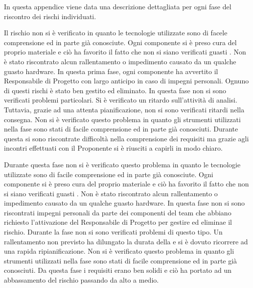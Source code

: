 	In questa appendice viene data una descrizione dettagliata per ogni fase del riscontro dei rischi individuati.


		Il rischio non si è verificato in quanto le tecnologie utilizzate sono di facele comprensione ed in parte già conosciute.
		Ogni componente si è preso cura del proprio materiale e ciò ha favorito il fatto che non si siano verificati guasti . Non è stato riscontrato alcun rallentamento o impedimento causato da un qualche guasto hardware.
		In questa prima fase, ogni componente ha avvertito il Responsabile di Progetto con largo anticipo in caso di impegni personali. Ognuno di questi rischi è stato ben gestito ed eliminato.
		In questa fase non si sono verificati problemi particolari.
		Si è verificato un ritardo sull’attività di analisi. Tuttavia, grazie ad una attenta pianificazione, non si sono verificati ritardi nella consegna.
		Non si è verificato questo problema in quanto gli strumenti utilizzati nella fase sono stati di facile comprensione ed in parte già conosciuti.
		Durante questa  si sono riscontrate difficoltà nella comprensione dei requisiti ma grazie agli incontri effettuati con il Proponente si è riusciti a capirli in modo chiaro.
		
	
		Durante questa fase non si è verificato questo problema in quanto le tecnologie utilizzate sono di facile comprensione ed in parte già conosciute. 
		Ogni componente si è preso cura del proprio materiale e ciò ha favorito il fatto che non si siano verificati guasti . Non è stato riscontrato alcun rallentamento o impedimento causato da un qualche guasto hardware.
		In questa fase non si sono riscontrati impegni personali da parte dei componenti del team che abbiano richiesto l'attivazione del Responsabile di Progetto per gestire ed eliminae il rischio.
		Durante la fase non si sono verificati problemi di questo tipo.
		Un rallentamento non previsto ha dilungato la durata della  e si è dovuto ricorrere ad una rapida ripianificazione.
		Non si è verificato questo problema in quanto gli strumenti utilizzati nella fase sono stati di facile comprensione ed in parte già conosciuti.
		Da questa fase  i requisiti erano ben solidi e ciò ha portato ad un abbassamento del rischio passando da alto a medio. 



